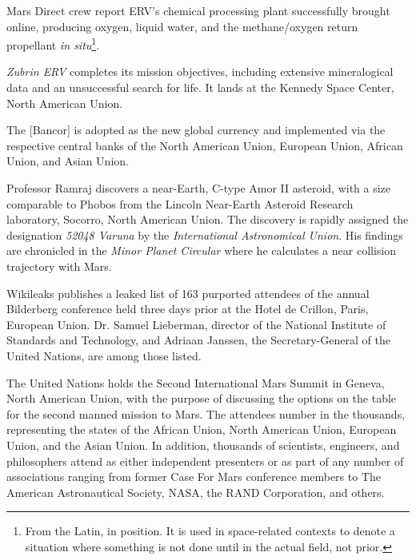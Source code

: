 Mars Direct crew report ERV's chemical processing plant successfully brought online, producing oxygen, liquid water, and the methane/oxygen return propellant {\it in situ}\footnote{From the Latin, in position. It is used in space-related contexts to denote a situation where something is not done until in the actual field, not prior.}.
\StopTimelineDate

{\it Zubrin ERV} completes its mission objectives, including extensive mineralogical data and an unsuccessful search for life. It lands at the Kennedy Space Center, North American Union.
\StopTimelineDate

The [Bancor] is adopted as the new global currency and implemented via the respective central banks of the North American Union, European Union, African Union, and Asian Union.
\StopTimelineDate

Professor Ramraj discovers a near-Earth, C-type Amor II asteroid, with a size comparable to Phobos from the Lincoln Near-Earth Asteroid Research laboratory, Socorro, North American Union. The discovery is rapidly assigned the designation {\it 52048 Varuna} by the {\it International Astronomical Union}. His findings are chronicled in the {\it Minor Planet Circular} where he calculates a near collision trajectory with Mars.
\StopTimelineDate

Wikileaks publishes a leaked list of 163 purported attendees of the annual Bilderberg conference held three days prior at the Hotel de Crillon, Paris, European Union. Dr. Samuel Lieberman, director of the National Institute of Standards and Technology, and Adriaan Janssen, the Secretary-General of the United Nations, are among those listed.
\StopTimelineDate

The United Nations holds the Second International Mars Summit in Geneva, North American Union, with the purpose of discussing the options on the table for the second manned mission to Mars. The attendees number in the thousands, representing the states of the African Union, North American Union, European Union, and the Asian Union. In addition, thousands of scientists, engineers, and philosophers attend as either independent presenters or as part of any number of associations ranging from former Case For Mars conference members to The American Astronautical Society, NASA, the RAND Corporation, and others.

